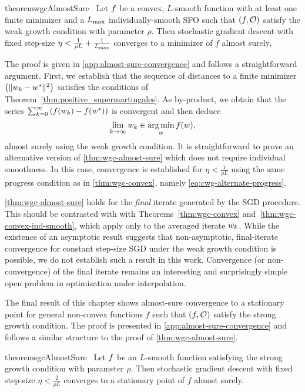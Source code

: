 \begin{restatable}{theorem}{wgcAlmostSure}~\label{thm:wgc-almost-sure}
    Let \( \f \) be a convex, \( L \)-smooth function with at least one finite minimizer and \oracle{} a \( \Lmax \) individually-smooth SFO such that \( \rbr{f, \oracle{}} \) satisfy the weak growth condition with parameter \( \rho \).
    Then stochastic gradient descent with fixed step-size \( \eta < \frac{1}{\rho L} + \frac{1}{\Lmax} \) converges to a minimizer of \( f \) almost surely,
\end{restatable}

The proof is given in \autoref{app:almost-sure-convergence} and follows a straightforward argument.
First, we establish that the sequence of distances to a finite minimizer \( \seq{\norm{\wk - \wopt}^2} \) satisfies the conditions of Theorem~\ref{thm:positive_supermartingales}.
As by-product, we obtain that the series \( \sum_{k=0}^{\infty} \rbr{f(\wk) - f(\wopt)} \) is convergent and then deduce
\[ \lim_{k\rightarrow\infty} \wk \in \argmin_w f(\w), \] 
almost surely using the weak growth condition.
It is straightforward to prove an alternative version of \autoref{thm:wgc-almost-sure} which does not require individual smoothness.
In this case, convergence is established for \( \eta < \frac{1}{\rho L} \) using the same progress condition as in \autoref{thm:wgc-convex}, namely \autoref{eq:cwg-alternate-progress}.

\autoref{thm:wgc-almost-sure} holds for the \emph{final} iterate generated by the SGD procedure.
This should be contrasted with with Theorems~\ref{thm:wgc-convex} and~\ref{thm:wgc-convex-ind-smooth}, which apply only to the averaged iterate \( \bar \wk \).
While the existence of an asymptotic result suggests that non-asymptotic, final-iterate convergence for constant step-size SGD under the weak growth condition is possible, we do not establish such a result in this work. 
Convergence (or non-convergence) of the final iterate remains an interesting and surprisingly simple open problem in optimization under interpolation.

The final result of this chapter shows almost-sure convergence to a stationary point for general non-convex functions \( f \) such that \( \rbr{f, \oracle{}} \) satisfy the strong growth condition.
The proof is presented in \autoref{app:almost-sure-convergence} and follows a similar structure to the proof of \autoref{thm:wgc-almost-sure}.

\begin{restatable}{theorem}{sgcAlmostSure}~\label{thm:sgc-almost-sure}
    Let \( \f \) be an \( L \)-smooth function satisfying the strong growth condition with parameter \(\rho \).
    Then stochastic gradient descent with fixed step-size \(\eta < \frac{2}{\rho L} \) converges to a stationary point of \( f \) almost surely.
\end{restatable}

\endinput

